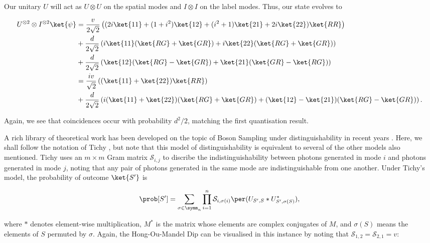 Our unitary $U$ will act as $U\otimes U$ on the spatial modes and $I\otimes I$ on the label modes. Thus, our state evolves to

\begin{align}
U^{\otimes 2}\otimes I^{\otimes 2}\ket{\psi} &= \frac{v}{2\sqrt{2}}\left((2i\ket{11}+(1+i^2)\ket{12}+(i^2+1)\ket{21}+2i\ket{22})\ket{RR}\right)\nonumber\\
&+\frac{d}{2\sqrt{2}}\left(i\ket{11}(\ket{RG}+\ket{GR})+i\ket{22}(\ket{RG}+\ket{GR})\right)\nonumber\\
&+\frac{d}{2\sqrt{2}}\left(\ket{12}(\ket{RG}-\ket{GR})+\ket{21}(\ket{GR}-\ket{RG})\right)\\
&= \frac{iv}{\sqrt{2}}\left((\ket{11}+\ket{22})\ket{RR}\right)\nonumber\\
&+\frac{d}{2\sqrt{2}}\left(i(\ket{11}+\ket{22})(\ket{RG}+\ket{GR})+(\ket{12}-\ket{21})(\ket{RG}-\ket{GR})\right).
\end{align}

Again, we see that coincidences occur with probability $d^2/2$, matching the first quantisation result.

A rich library of theoretical work has been developed on the topic of Boson Sampling under distinguishability in recent years \cite{rohde2015, shchesnovich2015, tichy2015, tamma2016nonidentical, menssen2017}. Here, we shall follow the notation of Tichy \cite{tichy2015}, but note that this model of distinguishability is equivalent to several of the other models also mentioned. Tichy uses an $m\times m$ Gram matrix $\mathcal{S}_{i,j}$ to discribe the indistinguishability between photons generated in mode $i$ and photons generated in mode $j$, noting that any pair of photons generated in the same mode are indistinguishable from one another. Under Tichy's model, the probability of outcome $\ket{S'}$ is

\begin{equation}
\prob[S'] = \sum_{\sigma\in\symm_n}\prod_{i=1}^n\mathcal{S}_{i,\sigma(i)}\per(U_{S',S}*U_{S',\sigma(S)}^*),
\label{eqn:tichy-perm}
\end{equation}

\noindent where $*$ denotes element-wise multiplication, $M^*$ is the matrix whose elements are complex conjugates of $M$, and $\sigma(S)$ means the elements of $S$ permuted by $\sigma$. Again, the Hong-Ou-Mandel Dip can be visualised in this instance by noting that $\mathcal{S}_{1,2} = \mathcal{S}_{2,1} = v$:

